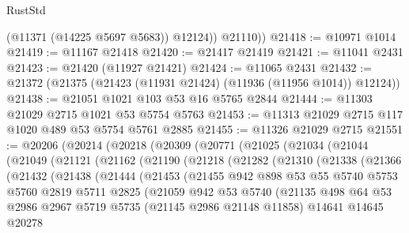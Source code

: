 \begin{lexlean}{RustStd}
\begin{coremodule}
            (@11371 (@14225 @5697 @5683))
            @12124))
        @21110))
@21418 := @10971 @1014
@21419 := @11167 @21418
@21420 := @21417 @21419
@21421 := @11041 @2431
@21423 := @21420 (@11927 @21421)
@21424 := @11065 @2431
@21432 := @21372 (@21375 (@21423 (@11931 @21424) (@11936 (@11956 @1014)) @12124))
@21438 := @21051 @1021 @103 @53 @16 @5765 @2844
@21444 := @11303 @21029 @2715 @1021 @53 @5754 @5763
@21453 := @11313 @21029 @2715 @117 @1020 @489 @53 @5754 @5761 @2885
@21455 := @11326 @21029 @2715
@21551 := @20206
    (@20214
      (@20218
        (@20309
          (@20771
            (@21025
              (@21034
                (@21044
                  (@21049
                    (@21121
                      (@21162
                        (@21190
                          (@21218
                            (@21282
                              (@21310
                                (@21338
                                  (@21366
                                    (@21432
                                      (@21438
                                        (@21444
                                          (@21453
                                            (@21455
                                              @942
                                              @898
                                              @53
                                              @55
                                              @5740
                                              @5753
                                              @5760
                                              @2819
                                              @5711
                                              @2825
                                              (@21059
                                                @942
                                                @53
                                                @5740
                                                (@21135
                                                  @498
                                                  @64
                                                  @53
                                                  @2986
                                                  @2967
                                                  @5719
                                                  @5735
                                                  (@21145 @2986 @21148 @11858)
                                                  @14641
                                                  @14645
                                                  @20278

\end{coremodule}
\end{lexlean}
